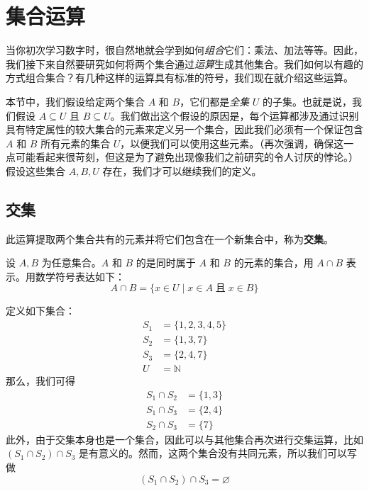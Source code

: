 \section{集合运算}\label{sec:section3.5}

当你初次学习数字时，很自然地就会学到如何\emph{组合}它们：乘法、加法等等。因此，我们接下来自然要研究如何将两个集合通过\emph{运算}生成其他集合。我们如何以有趣的方式组合集合？有几种这样的运算具有标准的符号，我们现在就介绍这些运算。

本节中，我们假设给定两个集合 $A$ 和 $B$，它们都是\emph{全集} $U$ 的子集。也就是说，我们假设 $A \subseteq U$ 且 $B \subseteq U$。我们做出这个假设的原因是，每个运算都涉及通过识别具有特定属性的较大集合的元素来定义另一个集合，因此我们必须有一个保证包含 $A$ 和 $B$ 所有元素的集合 $U$，以便我们可以使用这些元素。（再次强调，确保这一点可能看起来很苛刻，但这是为了避免出现像我们之前研究的令人讨厌的悖论。）假设这些集合 $A, B,U$ 存在，我们才可以继续我们的定义。

\subsection{交集}

此运算提取两个集合共有的元素并将它们包含在一个新集合中，称为\textbf{交集}。

\begin{definition}
    设 $A, B$ 为任意集合。$A$ 和 $B$ 的是同时属于 $A$ 和 $B$ 的元素的集合，用 $A \cap B$ 表示。用数学符号表达如下：
    \[A \cap B = \{x \in U \mid x \in A \;\text{且}\; x \in B\}\]
\end{definition}

\begin{example}\label{ex:example3.5.1}
    定义如下集合：
    \begin{align*}
        S_1 &= \{1, 2, 3, 4, 5\}\\
        S_2 &= \{1, 3, 7\}\\
        S_3 &= \{2, 4, 7\}\\
        U &= \mathbb{N}
    \end{align*}
    那么，我们可得
    \begin{align*}
        S_1 \cap S_2 &= \{1, 3\} \\
        S_1 \cap S_3 &= \{2, 4\} \\
        S_2 \cap S_3 &= \{7\}
    \end{align*}
    此外，由于交集本身也是一个集合，因此可以与其他集合再次进行交集运算，比如 $(S_1 \cap S_2) \cap S_3$ 是有意义的。然而，这两个集合没有共同元素，所以我们可以写做
    \[(S_1 \cap S_2) \cap S_3 = \varnothing\]
\end{example}


